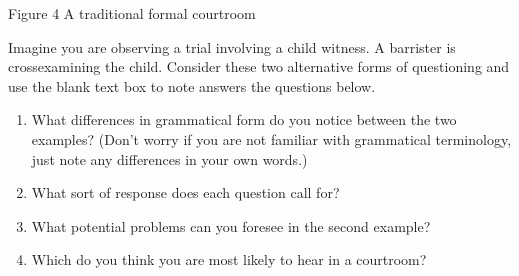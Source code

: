 \documentclass[letterpaper,10pt,english]{sphinxmanual}
\begin{document}
Figure 4 A traditional formal courtroom

Imagine you are observing a trial involving a child witness. A barrister is cross\sphinxhyphen{}examining the child. Consider these two alternative forms of questioning and use the blank text box to note answers the questions below.


\begin{enumerate}
%
\item {} 
What differences in grammatical form do you notice between the two examples? (Don’t worry if you are not familiar with grammatical terminology, just note any differences in your own words.)

\item {} 
What sort of response does each question call for?

\item {} 
What potential problems can you foresee in the second example?

\item {} 
Which do you think you are most likely to hear in a courtroom?

\end{enumerate}
\end{document}
